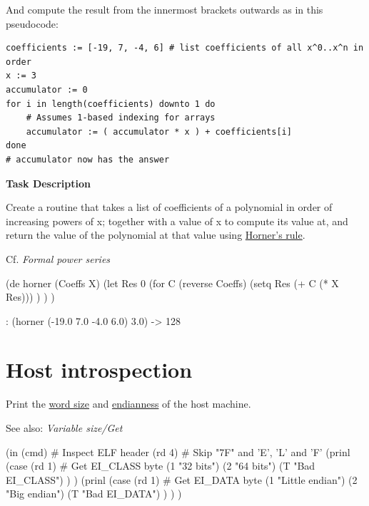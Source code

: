 \begin{itemize}
And compute the result from the innermost brackets outwards as in this
pseudocode:

\begin{verbatim}
coefficients := [-19, 7, -4, 6] # list coefficients of all x^0..x^n in order
x := 3
accumulator := 0
for i in length(coefficients) downto 1 do
    # Assumes 1-based indexing for arrays
    accumulator := ( accumulator * x ) + coefficients[i]
done
# accumulator now has the answer
\end{verbatim}

\textbf{Task Description}

Create a routine that takes a list of coefficients of a polynomial in
order of increasing powers of x; together with a value of x to compute
its value at, and return the value of the polynomial at that value using
\href{http://www.physics.utah.edu/~detar/lessons/c++/array/node1.html}{Horner's
rule}.

Cf. \emph{Formal power series}


\begin{wideverbatim}

(de horner (Coeffs X)
   (let Res 0
      (for C (reverse Coeffs)
         (setq Res (+ C (* X Res))) ) ) )

: (horner (-19.0 7.0 -4.0 6.0) 3.0)
-> 128

\end{wideverbatim}

\pagebreak{}
\section*{Host introspection}

Print the
\href{http://en.wikipedia.org/wiki/Word\_size\#Word\_size\_choice}{word
size} and \href{http://en.wikipedia.org/wiki/Endianness}{endianness} of
the host machine.

See also: \emph{Variable size/Get}


\begin{wideverbatim}

(in (cmd)                              # Inspect ELF header
   (rd 4)                              # Skip "7F" and 'E', 'L' and 'F'
   (prinl
      (case (rd 1)                     # Get EI_CLASS byte
         (1 "32 bits")
         (2 "64 bits")
         (T "Bad EI_CLASS") ) )
   (prinl
      (case (rd 1)                     # Get EI_DATA byte
         (1 "Little endian")
         (2 "Big endian")
         (T "Bad EI_DATA") ) ) )

\end{wideverbatim}


\end{itemize}
